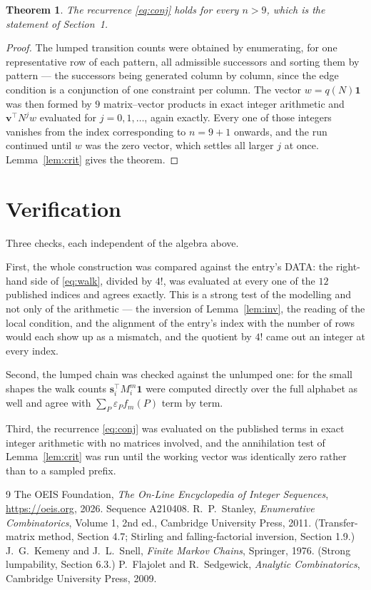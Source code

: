 \documentclass[11pt,a4paper]{article}
\theoremstyle{plain}
\newtheorem{theorem}{Theorem}
\theoremstyle{definition}
\begin{document}
\begin{theorem}
The recurrence \eqref{eq:conj} holds for every $n>9$, which is the statement of
Section~1.
\end{theorem}

\begin{proof}
The lumped transition counts were obtained by enumerating, for one representative row of
each pattern, all admissible successors and sorting them by pattern --- the successors being
generated column by column, since the edge condition is a conjunction of one constraint per
column. The vector $w=q(N)\mathbf{1}$ was then formed by $9$ matrix--vector products
in exact integer arithmetic and $\mathbf{v}^{\!\top}N^{j}w$ evaluated for
$j=0,1,\dots$, again exactly. Every one of those integers vanishes from the index
corresponding to $n=9+1$ onwards, and the run continued until $w$ was the zero vector,
which settles all larger $j$ at once. Lemma~\ref{lem:crit} gives the theorem.
\end{proof}

\section{Verification}

Three checks, each independent of the algebra above.

First, the whole construction was compared against the entry's DATA: the right-hand side of
\eqref{eq:walk}, divided by $4!$, was evaluated at every one of the $12$
published indices and agrees exactly. This is a strong test of the modelling and not only of
the arithmetic --- the inversion of Lemma~\ref{lem:inv}, the reading of the local
condition, and the alignment of the entry's index with the number of rows would each
show up as a mismatch, and the quotient by $4!$ came out an integer at every index.

Second, the lumped chain was checked against the unlumped one: for the small shapes the walk
counts $\mathbf{s}_i^{\!\top}M_i^{m}\mathbf{1}$ were computed directly over the full
alphabet as well and agree with $\sum_P\varepsilon_Pf_m(P)$ term by term.

Third, the recurrence \eqref{eq:conj} was evaluated on the published terms in exact integer
arithmetic with no matrices involved, and the annihilation test of Lemma~\ref{lem:crit} was
run until the working vector was identically zero rather than to a sampled prefix.

\begin{thebibliography}{9}
 The OEIS Foundation, \emph{The On-Line Encyclopedia of Integer
Sequences}, \url{https://oeis.org}, 2026. Sequence A210408.
 R.~P.~Stanley, \emph{Enumerative Combinatorics}, Volume 1, 2nd ed.,
Cambridge University Press, 2011. (Transfer-matrix method, Section 4.7; Stirling and
falling-factorial inversion, Section 1.9.)
 J.~G.~Kemeny and J.~L.~Snell, \emph{Finite Markov Chains}, Springer,
1976. (Strong lumpability, Section 6.3.)
 P.~Flajolet and R.~Sedgewick, \emph{Analytic Combinatorics}, Cambridge
University Press, 2009.
\end{thebibliography}
\end{document}

